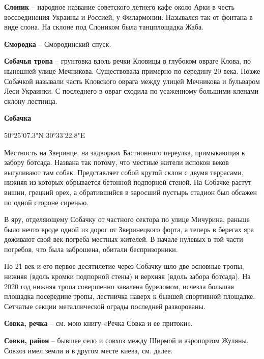 \medskip

\textbf{Слоник} – народное название советского летнего кафе около Арки в честь воссоединения Украины и Россией, у Филармонии. Назывался так от фонтана в виде слона. На склоне под Слоником была танцплощадка Жаба.\\

\medskip


\textbf{Смородка} – Смородинский спуск.\\

\medskip

\textbf{Собачья тропа} – грунтовка вдоль речки Кловицы в глубоком овраге Клова, по нынешней улице Мечникова. Существовала примерно по середину 20 века. Позже Собачкой называли часть Кловского оврага между улицей Мечникова и бульваром Леси Украинки. С последнего в овраг сходила по усаженному большими кленами склону лестница.\\

\medskip

\textbf{Собачка} 

50°25'07.3"N 30°33'22.8"E

Местность на Зверинце, на задворках Бастионного переулка, примыкающая к забору ботсада. Названа так потому, что местные жители испокон веков выгуливают там собак. Представляет собой крутой склон с двумя террасами, нижняя из которых обрывается бетонной подпорной стеной. На Собачке растут вишни, грецкий орех, а обратившийся в заросший пустырь стадион был обсажен по одной стороне сиренью.

В яру, отделяющему Собачку от частного сектора по улице Мичурина, раньше было нечто вроде одной из дорог от Зверинецкого форта, а теперь в берегах яра доживают свой век погреба местных жителей. В начале нулевых в той части погребов, что была заброшена, обитали беспризорники.

По 21 век и его первое десятилетие через Собачку шло две основные тропы, нижняя (вдоль кромки подпорной стены) и верхняя (вдоль забора ботсада). На 2020 год нижняя тропа совершенно завалена буреломом, исчезла большая площадка посередине тропы, лестничка наверх к бывшей спортивной площадке. Сетчатые секции металлической ограды последней разворованы.\\

\medskip

\textbf{Совка, речка} – см. мою книгу «Речка Совка и ее притоки».\\

\medskip

\textbf{Совки, район} – бывшее село и совхоз между Ширмой и аэропортом Жуляны. Совхоз имел земли и в другом месте киева, см. далее.\\


